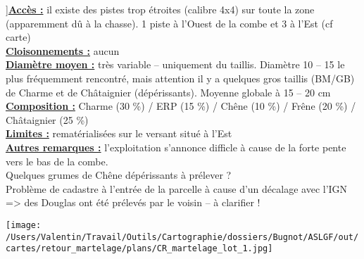 \documentclass[a4paper,openany]{book}\usepackage[]{graphicx}\usepackage[]{color}
\begin{document}
\begin{multicols}{2}
]\noindent\textbf{\underline{Accès :}} il existe des pistes trop étroites (calibre 4x4) sur toute la zone (apparemment dû à la chasse). 1 piste à l'Ouest de la combe et 3 à l'Est (cf carte)\vspace{0.1cm} \\\noindent\textbf{\underline{Cloisonnements :}} aucun\vspace{0.1cm} \\\noindent\textbf{\underline{Diamètre moyen :}} très variable -- uniquement du taillis. Diamètre 10 -- 15 le plus fréquemment rencontré, mais attention il y a quelques gros taillis (BM/GB) de Charme et de Châtaignier (dépérissants). Moyenne globale à 15 -- 20 cm\vspace{0.1cm} \\\noindent\textbf{\underline{Composition :}} Charme (30 \%) / ERP (15 \%) / Chêne (10 \%) / Frêne (20 \%) /  Châtaignier (25 \%)\vspace{0.1cm} \\\noindent\textbf{\underline{Limites :}} rematérialisées sur le versant situé à l'Est\vspace{0.1cm} \\\noindent\textbf{\underline{Autres remarques :}} l'exploitation s'annonce difficle à cause de la forte pente vers le bas de la combe. \\
Quelques grumes de Chêne dépérissants à prélever ? \\
Problème de cadastre à l'entrée de la parcelle à cause d'un décalage avec l'IGN => des Douglas ont été prélevés par le voisin -- à clarifier !\vspace{0.1cm} \\\end{multicols}\begin{center}
\texttt{[image: /Users/Valentin/Travail/Outils/Cartographie/dossiers/Bugnot/ASLGF/out/cartes/retour\_martelage/plans/CR\_martelage\_lot\_1.jpg]}
\end{center}\newpage\noindent
\end{document}
